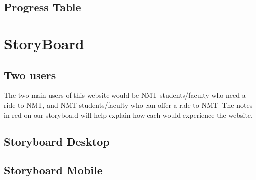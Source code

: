 \documentclass[10pt]{article}
\begin{document}
\subsection{Progress Table}

\begin{table}[h!]
\end{table}

\section{StoryBoard}
\subsection{Two users}
The two main users of this website would be NMT students/faculty who need a ride to NMT, and NMT students/faculty who can offer a ride to NMT. The notes in red on our storyboard will help explain how each would experience the website.

\subsection{Storyboard Desktop}


\subsection{Storyboard Mobile}

\end{document}
